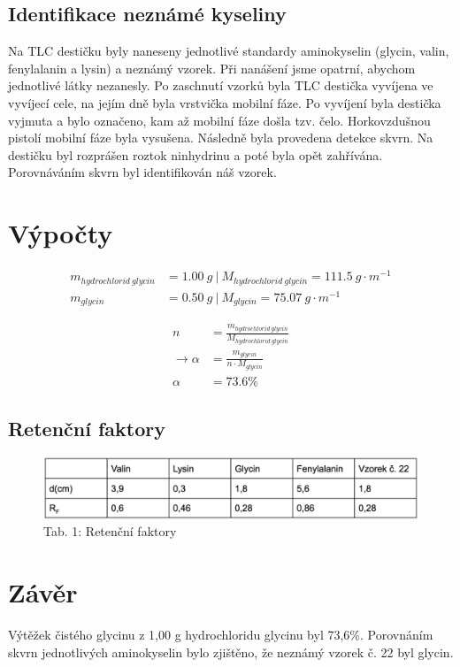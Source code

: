 \documentclass[13pt, a4paper, twoside]{article}
\begin{document}
    \subsection*{Identifikace neznámé kyseliny}
    Na TLC destičku byly naneseny jednotlivé standardy aminokyselin (glycin, valin, fenylalanin
    a lysin) a neznámý vzorek. Při nanášení jsme opatrní, abychom jednotlivé látky nezanesly.
    Po zaschnutí vzorků byla TLC destička vyvíjena ve vyvíjecí cele, na jejím dně byla vrstvička
    mobilní fáze. Po vyvíjení byla destička vyjmuta a bylo označeno, kam až mobilní fáze došla
    tzv. čelo. Horkovzdušnou pistolí mobilní fáze byla vysušena. Následně byla provedena
    detekce skvrn. Na destičku byl rozprášen roztok ninhydrinu a poté byla opět zahřívána.
    Porovnáváním skvrn byl identifikován náš vzorek.
    
    \section*{Výpočty}
        \begin{align*}
            m_{hydrochlorid\: glycin}&=1.00\: g \:|\: M_{hydrochlorid\: glycin}=111.5\: g\cdot m^{-1}\\
            m_{glycin}&=0.50\: g\:| \: M_{glycin}=75.07\: g\cdot m^{-1}
        \end{align*}


        \begin{align*}
            n&=\frac{m_{hydrochlorid\: glycin}}{M_{hydrochlorid\: glycin}}\\
            \to \alpha&=\frac{m_{glycin}}{n \cdot M_{glycin}}\\
            \alpha&=73.6\%
        \end{align*}

    \subsection*{Retenční faktory}
    \begin{figure}[H]
        \centering
        \includegraphics[width=6.5in]{uloha_2_tab_1.png}
        \caption*{Tab. 1: Retenční faktory}
    \end{figure}
    \section*{Závěr}
    Výtěžek čistého glycinu z 1,00 g hydrochloridu glycinu byl 73,6\%.
    Porovnáním skvrn jednotlivých aminokyselin bylo zjištěno, že neznámý vzorek č. 22 byl
    glycin.
    
\end{document}
